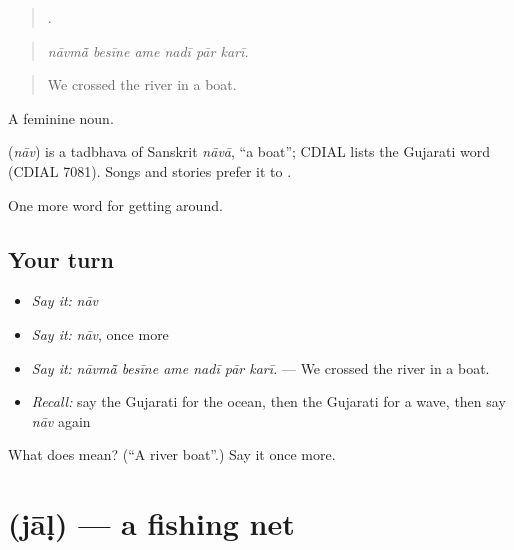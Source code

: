 \begin{quote}
     .
\end{quote}

\begin{quote}
\emph{nāvmā̃ besīne ame nadī pār karī.}
\end{quote}

\begin{quote}
We crossed the river in a boat.
\end{quote}

A feminine noun.

\begin{cousinweb}
\textbf{} (\emph{nāv}) is a tadbhava of Sanskrit \emph{nāvā}, \textquotedblleft{}a boat\textquotedblright{}; CDIAL lists the Gujarati word (CDIAL 7081). Songs and stories prefer it to .
\end{cousinweb}

\begin{grammarlens}[title={What you've built}]
One more word for getting around.
\end{grammarlens}

\subsection*{Your turn}
\begin{itemize}
\raggedright
  \item \emph{Say it:} \emph{nāv}
  \item \emph{Say it:} \emph{nāv}, once more
  \item \emph{Say it:} \emph{nāvmā̃ besīne ame nadī pār karī.} — We crossed the river in a boat.
  \item \emph{Recall:} say the Gujarati for the ocean, then the Gujarati for a wave, then say \emph{nāv} again
\end{itemize}

\begin{tcolorbox}[breakable,colback=teal!4,colframe=teal!35!black,title={Before you move on}]
What does  mean? (\textquotedblleft{}A river boat\textquotedblright{}.) Say it once more.
\end{tcolorbox}
\section[\texorpdfstring{\gu{જાળ} (jāḷ)}{જાળ (jāḷ)}]{ (jāḷ) — a fishing net}

\label{lesson:GU-C442-jal}



